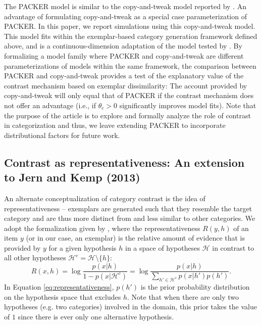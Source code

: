 \documentclass[12pt]{article}
\begin{document}
\begin{flushleft}
\label{section:copytweak-packer} The PACKER model is similar to the copy-and-tweak model reported by \cite{jern2013probabilistic}.
An advantage of formulating copy-and-tweak as a special case parameterization of PACKER. In this paper, we report simulations using this copy-and-tweak model. This model
fits within the exemplar-based category generation framework defined above, and
is a continuous-dimension adaptation of the model tested by
\cite{jern2013probabilistic}. By formalizing a model family where PACKER and
copy-and-tweak are different parameterizations of models within the same
framework, the comparison between PACKER and copy-and-tweak provides a test of
the explanatory value of the contrast mechanism based on exemplar dissimilarity:
The account provided by copy-and-tweak will only equal that of PACKER if the
contrast mechanism does not offer an advantage (i.e., if $\theta_c > 0$
significantly improves model fits). Note that the purpose of the article is to
explore and formally analyze the role of contrast in categorization and thus, we
leave extending PACKER to incorporate distributional factors for future work.

\subsection{Contrast as representativeness: An extension to Jern and Kemp
(2013)}
\label{section:representativeness-definition}

An alternate conceptualization of category contrast is the idea of
representativeness -- exemplars are generated such that they resemble the target
category and are thus more distinct from and less similar to other categories. We
adopt the formalization given by \cite{tenenbaum01}, where the
representativeness $R(y,h)$ of an item $y$ (or in our case, an exemplar) is the
relative amount of evidence that is provided by $y$ for a given hypothesis $h$
in a space of hypotheses $\mathcal{H}$ in contrast to all other hypotheses
$\mathcal{H}^c=\mathcal{H} \setminus \{h\}$:
\begin{equation}
  R(x,h) = \log \dfrac{p(x|h)}{1-p(x|\mathcal{H}^c)} = \log \dfrac{p(x|h)}{\sum_{h'\in \mathcal{H}^c}{p(x|h')p(h')}} . 
\label{eq:representativeness}
\end{equation}
In Equation \ref{eq:representativeness}, $p(h')$ is the prior probability
distribution on the hypothesis space that excludes $h$. Note that when there are
only two hypotheses (e.g. two categories) involved in the domain, this prior
takes the value of $1$ since there is ever only one alternative hypothesis. 


\end{flushleft}
\end{document}
